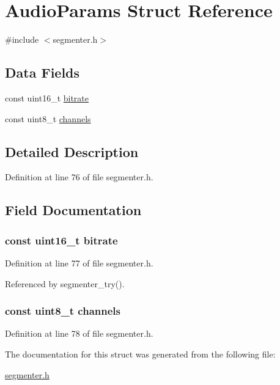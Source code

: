 \hypertarget{struct_audio_params}{\section{\-Audio\-Params \-Struct \-Reference}
\label{struct_audio_params}
}


{\ttfamily \#include $<$segmenter.\-h$>$}

\subsection*{\-Data \-Fields}
\begin{DoxyCompactItemize}
\item 
const uint16\-\_\-t \hyperlink{struct_audio_params_a90d9d9cc76bdecc14ce1bcda108dbc6c}{bitrate}
\item 
const uint8\-\_\-t \hyperlink{struct_audio_params_a50742bb65a8a9a00e12774189d49a2fc}{channels}
\end{DoxyCompactItemize}


\subsection{\-Detailed \-Description}


\-Definition at line 76 of file segmenter.\-h.



\subsection{\-Field \-Documentation}
\hypertarget{struct_audio_params_a90d9d9cc76bdecc14ce1bcda108dbc6c}{
\subsubsection[{bitrate}]{\setlength{\rightskip}{0pt plus 5cm}const uint16\-\_\-t {\bf bitrate}}}\label{struct_audio_params_a90d9d9cc76bdecc14ce1bcda108dbc6c}


\-Definition at line 77 of file segmenter.\-h.



\-Referenced by segmenter\-\_\-try().

\hypertarget{struct_audio_params_a50742bb65a8a9a00e12774189d49a2fc}{
\subsubsection[{channels}]{\setlength{\rightskip}{0pt plus 5cm}const uint8\-\_\-t {\bf channels}}}\label{struct_audio_params_a50742bb65a8a9a00e12774189d49a2fc}


\-Definition at line 78 of file segmenter.\-h.



\-The documentation for this struct was generated from the following file\-:\begin{DoxyCompactItemize}
\item 
\hyperlink{segmenter_8h}{segmenter.\-h}\end{DoxyCompactItemize}
